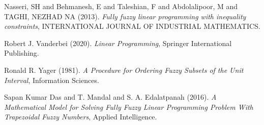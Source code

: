 \documentclass[11pt,a4paper,final]{article}
\begin{document}
\noindent
Nasseri, SH and Behmanesh, E and Taleshian, F and Abdolalipoor, M and TAGHI, NEZHAD NA (2013). \emph{Fully fuzzy linear programming with inequality constraints}, INTERNATIONAL JOURNAL OF INDUSTRIAL MATHEMATICS.

\noindent
Robert J. Vanderbei (2020). \emph{Linear Programming}, Springer International Publishing.

\noindent
Ronald R. Yager (1981). \emph{A Procedure for Ordering Fuzzy Subsets of the Unit Interval}, Information Sciences.

\noindent
Sapan Kumar Das and T. Mandal and S. A. Edalatpanah (2016). \emph{A Mathematical Model for Solving Fully Fuzzy Linear Programming Problem With Trapezoidal Fuzzy Numbers}, Applied Intelligence.
\end{document}
